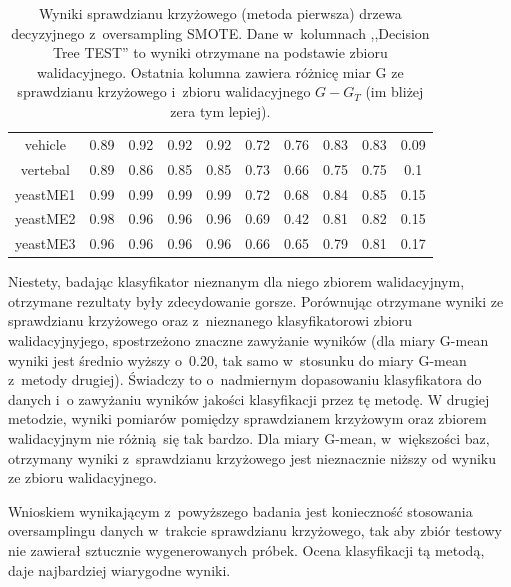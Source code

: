 \begin{table}[h]
\begin{center}
{\begin{tabular}{|c|c|c|c|c|c|c|c|c|c|}
				vehicle&0.89&0.92&0.92&0.92&0.72&0.76&0.83&0.83&0.09\\%
				vertebal&0.89&0.86&0.85&0.85&0.73&0.66&0.75&0.75&0.1\\%
				yeastME1&0.99&0.99&0.99&0.99&0.72&0.68&0.84&0.85&0.15\\%
				yeastME2&0.98&0.96&0.96&0.96&0.69&0.42&0.81&0.82&0.15\\%
				yeastME3&0.96&0.96&0.96&0.96&0.66&0.65&0.79&0.81&0.17\\%
				\hline%
			\end{tabular}}%
			\caption[Wyniki sprawdzianu krzyżowego z~metodą SMOTE, metoda pierwsza]{Wyniki sprawdzianu krzyżowego (metoda pierwsza) drzewa decyzyjnego z~oversampling SMOTE. Dane w~kolumnach ,,Decision Tree TEST'' to wyniki otrzymane na podstawie zbioru walidacyjnego. Ostatnia kolumna zawiera różnicę  miar G ze sprawdzianu krzyżowego i~zbioru walidacyjnego $G-G_T$ (im bliżej zera tym lepiej).}
			\label{CVoversampling1}
		\end{center}
	\end{table}
Niestety, badając klasyfikator nieznanym dla niego zbiorem walidacyjnym, otrzymane rezultaty były zdecydowanie gorsze. Porównując otrzymane wyniki ze sprawdzianu krzyżowego oraz z~nieznanego klasyfikatorowi zbioru walidacyjnyjego, spostrzeżono znaczne zawyżanie wyników (dla miary G-mean wyniki jest średnio wyższy o~0.20, tak samo w~stosunku do miary G-mean z~metody drugiej). Świadczy to o~nadmiernym dopasowaniu klasyfikatora do danych i~o zawyżaniu wyników jakości klasyfikacji przez tę metodę. W drugiej metodzie, wyniki pomiarów pomiędzy sprawdzianem krzyżowym oraz zbiorem walidacyjnym nie różnią się tak bardzo. Dla miary G-mean, w~większości baz, otrzymany wyniki z~sprawdzianu krzyżowego jest nieznacznie niższy od wyniku ze zbioru walidacyjnego. \par
Wnioskiem wynikającym z~powyższego badania jest konieczność stosowania oversamplingu danych w~trakcie sprawdzianu krzyżowego, tak aby zbiór testowy nie zawierał sztucznie wygenerowanych próbek. Ocena klasyfikacji tą metodą, daje najbardziej wiarygodne wyniki.



